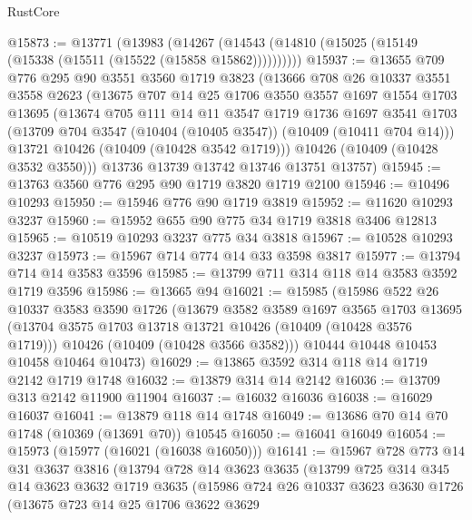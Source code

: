 \begin{lexlean}{RustCore}
\begin{coremodule}
@15873 := @13771
    (@13983 (@14267 (@14543 (@14810 (@15025 (@15149 (@15338 (@15511 (@15522 (@15858 @15862))))))))))
@15937 := @13655
    @709
    @776
    @295
    @90
    @3551
    @3560
    @1719
    @3823
    (@13666
      @708
      @26
      @10337
      @3551
      @3558
      @2623
      (@13675
        @707
        @14
        @25
        @1706
        @3550
        @3557
        @1697
        @1554
        @1703
        @13695
        (@13674
          @705
          @111
          @14
          @11
          @3547
          @1719
          @1736
          @1697
          @3541
          @1703
          (@13709 @704 @3547 (@10404 (@10405 @3547)) (@10409 (@10411 @704 @14)))
          @13721
          @10426
          (@10409 (@10428 @3542 @1719)))
        @10426
        (@10409 (@10428 @3532 @3550)))
      @13736
      @13739
      @13742
      @13746
      @13751
      @13757)
@15945 := @13763 @3560 @776 @295 @90 @1719 @3820 @1719 @2100
@15946 := @10496 @10293
@15950 := @15946 @776 @90 @1719 @3819
@15952 := @11620 @10293 @3237
@15960 := @15952 @655 @90 @775 @34 @1719 @3818 @3406 @12813
@15965 := @10519 @10293 @3237 @775 @34 @3818
@15967 := @10528 @10293 @3237
@15973 := @15967 @714 @774 @14 @33 @3598 @3817
@15977 := @13794 @714 @14 @3583 @3596
@15985 := @13799 @711 @314 @118 @14 @3583 @3592 @1719 @3596
@15986 := @13665 @94
@16021 := @15985
    (@15986
      @522
      @26
      @10337
      @3583
      @3590
      @1726
      (@13679
        @3582
        @3589
        @1697
        @3565
        @1703
        @13695
        (@13704 @3575 @1703 @13718 @13721 @10426 (@10409 (@10428 @3576 @1719)))
        @10426
        (@10409 (@10428 @3566 @3582)))
      @10444
      @10448
      @10453
      @10458
      @10464
      @10473)
@16029 := @13865 @3592 @314 @118 @14 @1719 @2142 @1719 @1748
@16032 := @13879 @314 @14 @2142
@16036 := @13709 @313 @2142 @11900 @11904
@16037 := @16032 @16036
@16038 := @16029 @16037
@16041 := @13879 @118 @14 @1748
@16049 := @13686 @70 @14 @70 @1748 (@10369 (@13691 @70)) @10545
@16050 := @16041 @16049
@16054 := @15973 (@15977 (@16021 (@16038 @16050)))
@16141 := @15967
    @728
    @773
    @14
    @31
    @3637
    @3816
    (@13794
      @728
      @14
      @3623
      @3635
      (@13799
        @725
        @314
        @345
        @14
        @3623
        @3632
        @1719
        @3635
        (@15986
          @724
          @26
          @10337
          @3623
          @3630
          @1726
          (@13675
            @723
            @14
            @25
            @1706
            @3622
            @3629

\end{coremodule}
\end{lexlean}
